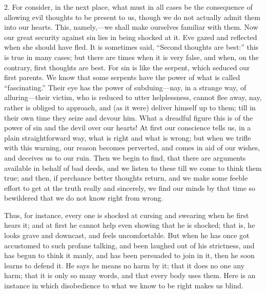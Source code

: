 2. For consider, in the next place, what must in all cases be the
consequence of allowing evil thoughts to be present to us, though we
do not actually admit them into our hearts. This, namely,—we shall
make ourselves familiar with them. Now our great security against sin
lies in being shocked at it. Eve gazed and reflected when she should
have fled. It is sometimes said, ``Second thoughts are best:''
this is true in many cases; but there are times when it is very false,
and when, on the contrary, first thoughts are best. For sin is like
the serpent, which seduced our first parents. We know that some
serpents have the power of what is called ``fascinating.''
Their eye has the power of subduing—nay, in a strange way, of
alluring—their victim, who is reduced to utter helplessness, cannot
flee away, nay, rather is obliged to approach, and (as it were)
deliver himself up to them; till in their own time they seize and
devour him. What a dreadful figure this is of the power of sin and the
devil over our hearts! At first our conscience tells us, in a plain
straightforward way, what is right and what is wrong; but when we
trifle with this warning, our reason becomes perverted, and comes in
aid of our wishes, and deceives us to our ruin. Then we begin to find,
that there are arguments available in behalf of bad deeds, and we
listen to these till we come to think them true; and then, if
perchance better thoughts return, and we make some feeble effort to
get at the truth really and sincerely, we find our minds by that time
so bewildered that we do not know right from wrong.

Thus, for instance, every one is shocked at cursing and swearing
when he first hears it; and at first he cannot help even showing that
he is shocked; that is, he looks grave and downcast, and feels
uncomfortable. But when he has once got accustomed to such profane
talking, and been laughed out of his strictness, and has begun to
think it manly, and has been persuaded to join in it, then he soon
learns to defend it. He says he means no harm by it; that it does no
one any harm; that it is only so many words, and that every body uses
them. Here is an instance in which disobedience to what we know to be
right makes us blind.

